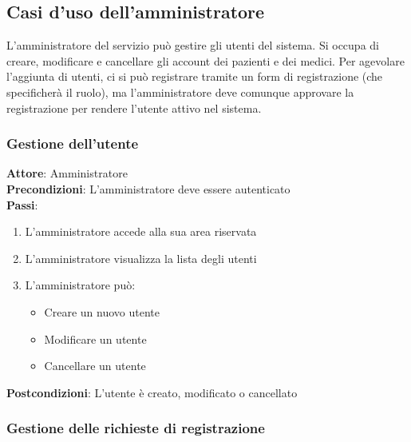 \documentclass[a4paper]{article}
\begin{document}
\subsection{Casi d'uso dell'amministratore}

L'amministratore del servizio può gestire gli utenti del sistema. Si occupa di creare, modificare e cancellare
gli account dei pazienti e dei medici. Per agevolare l'aggiunta di utenti, ci si può registrare
tramite un form di registrazione (che specificherà il ruolo), ma l'amministratore deve comunque
approvare la registrazione per rendere l'utente attivo nel sistema.

\subsubsection{Gestione dell'utente}

\begin{mdframed}
  \textbf{Attore}: Amministratore\\
  \textbf{Precondizioni}: L'amministratore deve essere autenticato\\
  \textbf{Passi}: 
  \begin{enumerate}[nosep]
    \item L'amministratore accede alla sua area riservata
    \item L'amministratore visualizza la lista degli utenti
    \item L'amministratore può:
      \begin{itemize}
        \item  Creare un nuovo utente
        \item  Modificare un utente
        \item  Cancellare un utente
      \end{itemize}
  \end{enumerate}
  \textbf{Postcondizioni}: L'utente è creato, modificato o cancellato
\end{mdframed}

\subsubsection{Gestione delle richieste di registrazione}
\end{document}
